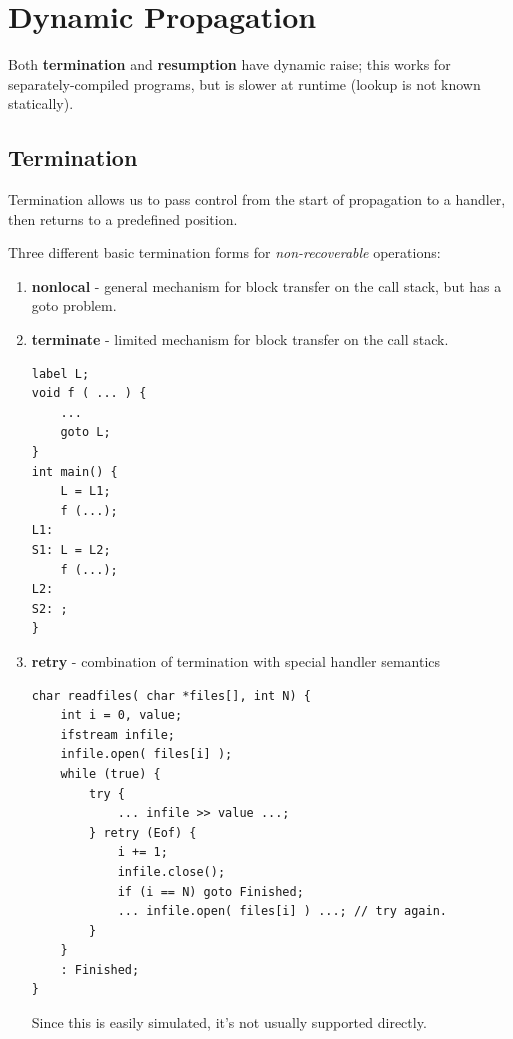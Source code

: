         \section{Dynamic Propagation} %
        \label{sec:dynamic_propagation}
            Both \textbf{termination} and \textbf{resumption} have dynamic raise; this works for separately-compiled programs, but is slower at runtime (lookup is not known statically).

            \subsection{Termination} %
            \label{sub:termination}
                Termination allows us to pass control from the start of propagation to a handler, then returns to a predefined position.

                Three different basic termination forms for \emph{non-recoverable} operations:
                \begin{enumerate}
                    \item \textbf{nonlocal} - general mechanism for block transfer on the call stack, but has a goto problem.
                    \item \textbf{terminate} - limited mechanism for block transfer on the call stack.

                        \begin{lstlisting}
label L;
void f ( ... ) {
    ...
    goto L;
}
int main() {
    L = L1;
    f (...);
L1:
S1: L = L2;
    f (...);
L2:
S2: ;
}
                        \end{lstlisting}
                    \item \textbf{retry} - combination of termination with special handler semantics
                        \begin{lstlisting}
char readfiles( char *files[], int N) {
    int i = 0, value;
    ifstream infile;
    infile.open( files[i] );
    while (true) {
        try {
            ... infile >> value ...;
        } retry (Eof) {
            i += 1;
            infile.close();
            if (i == N) goto Finished;
            ... infile.open( files[i] ) ...; // try again.
        }
    }
    : Finished;
}
                        \end{lstlisting}
                        Since this is easily simulated, it's not usually supported directly.
                \end{enumerate}


